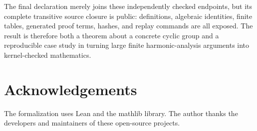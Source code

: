 \documentclass[10pt,twocolumn]{article}
\theoremstyle{definition}
\theoremstyle{remark}
\begin{document}
The final declaration merely joins these independently checked endpoints, but
its complete transitive source closure is public: definitions, algebraic
identities, finite tables, generated proof terms, hashes, and replay commands
are all exposed.  The result is therefore both a theorem about a concrete
cyclic group and a reproducible case study in turning large finite
harmonic-analysis arguments into kernel-checked mathematics.

\section*{Acknowledgements}

The formalization uses Lean and the mathlib library.  The author thanks the
developers and maintainers of these open-source projects.

\begingroup
\footnotesize


\endgroup
\end{document}
